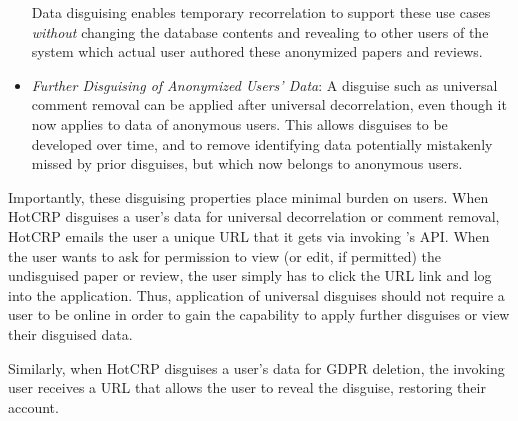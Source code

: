 \begin{itemize}
Data disguising enables temporary recorrelation to support these use cases \emph{without} changing
        the database contents and revealing to other users of the system
which actual user authored these anonymized papers and reviews.

\item \emph{Further Disguising of Anonymized Users' Data}: A disguise such as universal comment
        removal can be applied after universal decorrelation, even though it now applies to data of anonymous users.
This allows disguises to be developed over time, and to remove identifying data potentially mistakenly missed by prior
disguises, but which now belongs to anonymous users.
\end{itemize}

Importantly, these disguising properties place minimal burden on users.
%
When HotCRP disguises a user's data for universal decorrelation or comment removal, HotCRP emails
the user a unique URL that it gets via invoking \sys's API.  When the user
wants to ask for permission to view (or edit, if permitted) the undisguised paper or review, the
user simply has to click the URL link and log into the application. Thus, application of universal
disguises should not require a user to be online in order to gain the capability to apply further
disguises or view their disguised data.

Similarly, when HotCRP disguises a user's data for GDPR deletion, the invoking user receives a URL
that allows the user to reveal the disguise, restoring their account.

